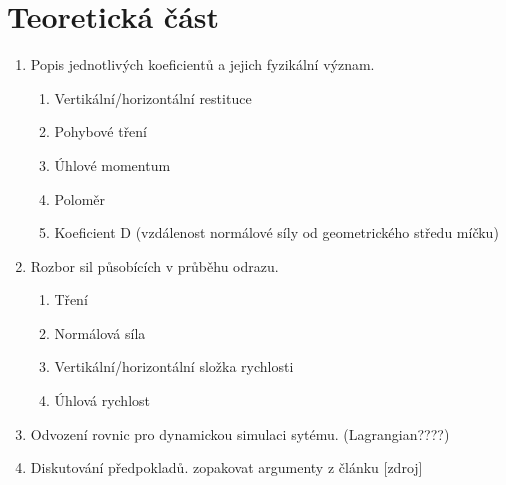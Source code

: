\part{Teoretická část}
\label{part:teoreticka-cast}
\begin{enumerate}
\item Popis jednotlivých koeficientů a jejich fyzikální význam.
 \begin{enumerate}
  \item Vertikální/horizontální restituce
  \item Pohybové tření
  \item Úhlové momentum
  \item Poloměr
  \item Koeficient D (vzdálenost normálové síly od geometrického středu míčku)
 \end{enumerate}
 \item Rozbor sil působících v průběhu odrazu.
 \begin{enumerate}
  \item Tření
  \item Normálová síla
  \item Vertikální/horizontální složka rychlosti
  \item Úhlová rychlost
 \end{enumerate} 
 \item Odvození rovnic pro dynamickou simulaci sytému. (Lagrangian????)
 \item Diskutování předpokladů. zopakovat argumenty z článku [zdroj]
\end{enumerate}


